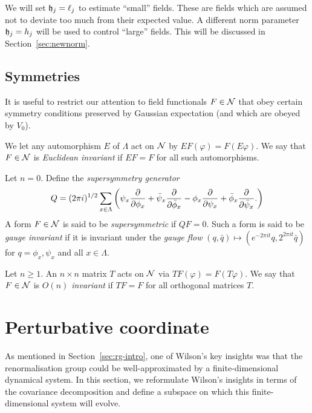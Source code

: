 We will set $\mathfrak{h}_j = \ell_j$ to estimate ``small'' fields. These are fields which
are assumed not to deviate too much from their expected value. A different norm
parameter $\mathfrak{h}_j = h_j$ will be used to control ``large'' fields.
This will be discussed in Section~\ref{sec:newnorm}.


\subsection{Symmetries}

It is useful to restrict our attention to field functionals $F \in \mathcal{N}$ that
obey certain symmetry conditions preserved by Gaussian expectation (and which
are obeyed by $V_0$).

We let any automorphism $E$ of $\Lambda$ act on $\mathcal{N}$ by $EF(\varphi) = F(E\varphi)$.
We say that $F\in\mathcal{N}$ is \emph{Euclidean invariant} if $EF = F$ for all such automorphisms.

Let $n = 0$.
Define the \emph{supersymmetry generator}
\begin{equation}
Q = (2\pi i)^{1/2} \sum_{x\in\Lambda}
\left(
	\psi_x \frac{\partial }{\partial \phi_x} + \bar\psi_x \frac{\partial }{\partial \bar\phi_x}
		-
	\phi_x \frac{\partial }{\partial \psi_x} + \bar\phi_x \frac{\partial }{\partial \bar\psi_x}.
\right)
\end{equation}
A form $F \in \mathcal{N}$ is said to be \emph{supersymmetric} if $Q F = 0$.
Such a form is said to be \emph{gauge invariant} if it is invariant under the
\emph{gauge flow} $(q, \bar q) \mapsto (e^{-2\pi it} q, 2^{2\pi it} \bar q)$
for $q = \phi_x, \psi_x$ and all $x\in\Lambda$.

Let $n \ge 1$.
An $n \times n$ matrix $T$ acts on $\mathcal{N}$ via $T F(\varphi) = F(T \varphi)$.
We say that $F\in\mathcal{N}$ is \emph{$O(n)$ invariant} if $TF = F$ for all
orthogonal matrices $T$.


\section{Perturbative coordinate}

As mentioned in Section~\ref{sec:rg-intro}, one of Wilson's key insights was that the renormalisation
group could be well-approximated by a finite-dimensional dynamical system. In this
section, we reformulate Wilson's insights in terms of the covariance decomposition
and define a subspace on which this finite-dimensional system will evolve.

